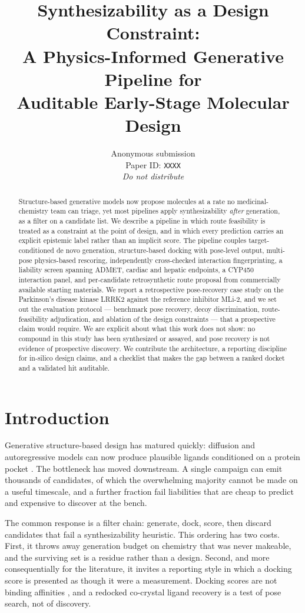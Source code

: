 \documentclass[10pt,twocolumn]{article}
\title{\bfseries Synthesizability as a Design Constraint:\\
A Physics-Informed Generative Pipeline for\\
Auditable Early-Stage Molecular Design}
\author{Anonymous submission\\
Paper ID: \texttt{XXXX}\\
\textit{Do not distribute}
}
\date{}
\begin{document}
\maketitle

\begin{abstract}
Structure-based generative models now propose molecules at a rate no
medicinal-chemistry team can triage, yet most pipelines apply synthesizability
\emph{after} generation, as a filter on a candidate list. We describe a
pipeline in which route feasibility is treated as a constraint at the point of
design, and in which every prediction carries an explicit epistemic label
rather than an implicit score. The pipeline couples target-conditioned de novo
generation, structure-based docking with pose-level output, multi-pose
physics-based rescoring, independently cross-checked interaction
fingerprinting, a liability screen spanning ADMET, cardiac and hepatic
endpoints, a CYP450 interaction panel, and per-candidate retrosynthetic route
proposal from commercially available starting materials. We report a
retrospective pose-recovery case study on the Parkinson's disease kinase LRRK2
against the reference inhibitor MLi-2, and we set out the evaluation protocol
--- benchmark pose recovery, decoy discrimination, route-feasibility
adjudication, and ablation of the design constraints --- that a prospective
claim would require. We are explicit about what this work does not show: no
compound in this study has been synthesized or assayed, and pose recovery is
not evidence of prospective discovery. We contribute the architecture, a
reporting discipline for in-silico design claims, and a checklist that makes
the gap between a ranked docket and a validated hit auditable.
\end{abstract}

\section{Introduction}

Generative structure-based design has matured quickly: diffusion and
autoregressive models can now produce plausible ligands conditioned on a
protein pocket \citep{schneuing2024diffsbdd,peng2022pocket2mol,guan2023targetdiff}.
The bottleneck has moved downstream. A single campaign can emit thousands of
candidates, of which the overwhelming majority cannot be made on a useful
timescale, and a further fraction fail liabilities that are cheap to predict
and expensive to discover at the bench.

The common response is a filter chain: generate, dock, score, then discard
candidates that fail a synthesizability heuristic. This ordering has two
costs. First, it throws away generation budget on chemistry that was never
makeable, and the surviving set is a residue rather than a design. Second, and
more consequentially for the literature, it invites a reporting style in which
a docking score is presented as though it were a measurement. Docking scores
are not binding affinities \citep{trott2010vina}, and a redocked co-crystal
ligand recovery is a test of pose search, not of discovery.
\end{document}
